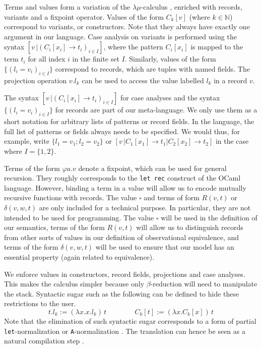 Terms and values form a variation of the $λμ$-calculus \cite{Parigot1992},
enriched with records, variants and a fixpoint operator. Values of the form
$C_k[v]$ (where $k ∈ \mathbb{N}$) correspond to variants, or constructors.
Note that they always have exactly one argument in our language. Case analysis
on variants is performed using the syntax $[v\,| (C_i[x_i] → t_i)_{i∈I}]$,
where the pattern $C_i[x_i]$ is mapped to the term $t_i$ for all index $i$ in
the finite set $I$. Similarly, values of the form $\{(l_i = v_i)_{i∈I}\}$
correspond to records, which are tuples with named fields. The projection
operation $v.l_k$ can be used to access the value labelled $l_k$ in a record
$v$.
\begin{remark}
  The syntax $[v\,| (C_i[x_i] → t_i)_{i∈I}]$ for case analyses and the syntax
  $\{(l_i = v_i)_{i∈I}\}$ for records are part of our meta-language. We only
  use them as a short notation for arbitrary lists of patterns or record
  fields. In the language, the full list of patterns or fields always needs
  to be specified. We would thus, for example, write $\{l_1=v_1; l_2=v_2\}$ or
  $[v\,| C_1[x_1] → t_1 | C_2[x_2] → t_2]$ in the case where $I = \{1, 2\}$.
\end{remark}
Terms of the form $φa.v$ denote a fixpoint, which can be used for general
recursion. They roughly corresponds to the \verb#let rec# construct of the
OCaml language. However, binding a term in a value will allow us to encode
mutually recursive functions with records.
%
The value $\square$ and terms of form $R(v,t)$ or $δ(v,w,t)$ are only
included for a technical purpose. In particular, they are not intended
to be used for programming. The value $\square$ will be used in the
definition of our semantics, terms of the form $R(v,t)$ will allow us
to distinguish records from other sorts of values in our definition of
observational equivalence, and terms of the form $δ(v,w,t)$ will be
used to ensure that our model has an essential property (again related
to equivalence).

\begin{remark}
  We enforce values in constructors, record fields, projections and case
  analyses. This makes the calculus simpler because only $β$-reduction
  will need to manipulate the stack. Syntactic sugar such as the following
  can be defined to hide these restrictions to the user.
  $$
    t.l_k := (λx.x.l_k)\,t
    \quad\quad\quad\quad
    C_k[t] := (λx.C_k[x])\,t
  $$
  Note that the elimination of such syntactic sugar corresponds to a form of
  partial \verb#let#-normalization \cite{Moggi1989} or \verb#A#-normalization
  \cite{Flanagan1993}. The translation can hence be seen as a natural
  compilation step \cite{Tarditi1996, Chlipala2005}.
\end{remark}

